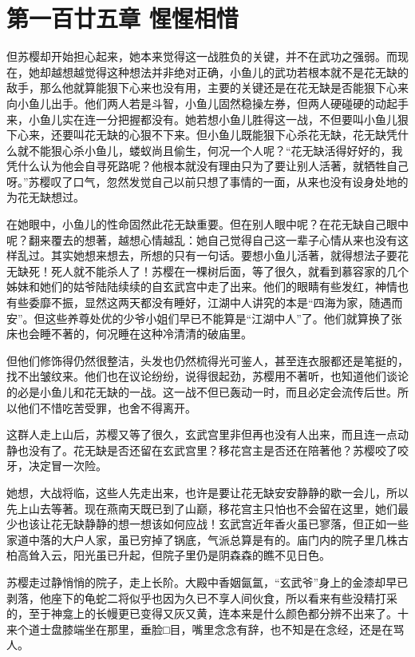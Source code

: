 \documentclass[12pt,oneside]{book}
\begin{document}
\hypertarget{ux7b2cux4e00ux767eux5effux4e94ux7ae0-ux60faux60faux76f8ux60dc}{%
\chapter{第一百廿五章
惺惺相惜}\label{ux7b2cux4e00ux767eux5effux4e94ux7ae0-ux60faux60faux76f8ux60dc}}

但苏樱却开始担心起来，她本来觉得这一战胜负的关键，并不在武功之强弱。而现在，她却越想越觉得这种想法并非绝对正确，小鱼儿的武功若根本就不是花无缺的敌手，那么他就算能狠下心来也没有用，主要的关键还是在花无缺是否能狠下心来向小鱼儿出手。他们两人若是斗智，小鱼儿固然稳操左券，但两人硬碰硬的动起手来，小鱼儿实在连一分把握都没有。她若想小鱼儿胜得这一战，不但要叫小鱼儿狠下心来，还要叫花无缺的心狠不下来。但小鱼儿既能狠下心杀花无缺，花无缺凭什么就不能狠心杀小鱼儿，蝼蚁尚且偷生，何况一个人呢？``花无缺活得好好的，我凭什么认为他会自寻死路呢？他根本就没有理由只为了要让别人活著，就牺牲自己呀。''苏樱叹了口气，忽然发觉自己以前只想了事情的一面，从来也没有设身处地的为花无缺想过。

在她眼中，小鱼儿的性命固然此花无缺重要。但在别人眼中呢？在花无缺自己眼中呢？翻来覆去的想著，越想心情越乱：她自己觉得自己这一辈子心情从来也没有这样乱过。其实她想来想去，所想的只有一句话。要想小鱼儿活著，就得想法子要花无缺死！死人就不能杀人了！苏樱在一棵树后面，等了很久，就看到慕容家的几个姊妹和她们的姑爷陆陆续续的自玄武宫中走了出来。他们的眼睛有些发红，神情也有些委靡不振，显然这两天都没有睡好，江湖中人讲究的本是``四海为家，随遇而安''。但这些养尊处优的少爷小姐们早已不能算是``江湖中人''了。他们就算换了张床也会睡不著的，何况睡在这种冷清清的破庙里。

但他们修饰得仍然很整洁，头发也仍然梳得光可鉴人，甚至连衣服都还是笔挺的，找不出皱纹来。他们也在议论纷纷，说得很起劲，苏樱用不著听，也知道他们谈论的必是小鱼儿和花无缺的一战。这一战不但已轰动一时，而且必定会流传后世。所以他们不惜吃苦受罪，也舍不得离开。

这群人走上山后，苏樱又等了很久，玄武宫里非但再也没有人出来，而且连一点动静也没有了。花无缺是否还留在玄武宫里？移花宫主是否还在陪著他？苏樱咬了咬牙，决定冒一次险。

她想，大战将临，这些人先走出来，也许是要让花无缺安安静静的歇一会儿，所以先上山去等著。现在燕南天既已到了山巅，移花宫主只怕也不会留在这里，她们最少也该让花无缺静静的想一想该如何应战！玄武宫近年香火虽已寥落，但正如一些家道中落的大户人家，虽已穷掉了锅底，气派总算是有的。庙门内的院子里几株古柏高耸入云，阳光虽已升起，但院子里仍是阴森森的瞧不见日色。

苏樱走过静悄悄的院子，走上长阶。大殿中香姻氤氲，``玄武爷''身上的金漆却早已剥落，他座下的龟蛇二将似乎也因为久已不享人间伙食，所以看来有些没精打采的，至于神龛上的长幔更已变得又灰又黄，连本来是什么颜色都分辨不出来了。十来个道士盘膝端坐在那里，垂脸□目，嘴里念念有辞，也不知是在念经，还是在骂人。
\end{document}
